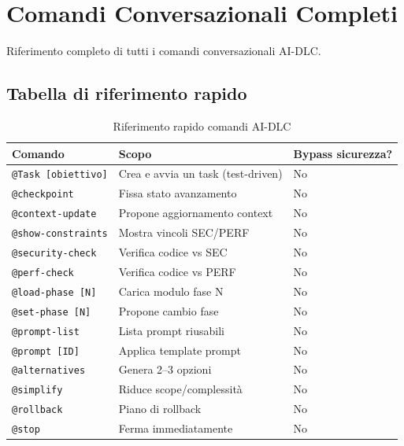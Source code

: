 ﻿%

\chapter{Comandi Conversazionali Completi}
\label{app:comandi}

Riferimento completo di tutti i comandi conversazionali AI-DLC.

\section*{Tabella di riferimento rapido}

\begin{table}[htbp]
  \centering
  \begin{tabular}{lll}
    \toprule
    \textbf{Comando} & \textbf{Scopo} & \textbf{Bypass sicurezza?} \\
    \midrule
    \texttt{@Task [obiettivo]} & Crea e avvia un task (test-driven) & No \\
    \texttt{@checkpoint} & Fissa stato avanzamento & No \\
    \texttt{@context-update} & Propone aggiornamento context & No \\
    \texttt{@show-constraints} & Mostra vincoli SEC/PERF & No \\
    \texttt{@security-check} & Verifica codice vs SEC & No \\
    \texttt{@perf-check} & Verifica codice vs PERF & No \\
    \texttt{@load-phase [N]} & Carica modulo fase N & No \\
    \texttt{@set-phase [N]} & Propone cambio fase & No \\
    \texttt{@prompt-list} & Lista prompt riusabili & No \\
    \texttt{@prompt [ID]} & Applica template prompt & No \\
    \texttt{@alternatives} & Genera 2--3 opzioni & No \\
    \texttt{@simplify} & Riduce scope/complessità & No \\
    \texttt{@rollback} & Piano di rollback & No \\
    \texttt{@stop} & Ferma immediatamente & No \\
    \bottomrule
  \end{tabular}
  \caption{Riferimento rapido comandi AI-DLC}
  \label{tab:app-b-comandi}
\end{table}

